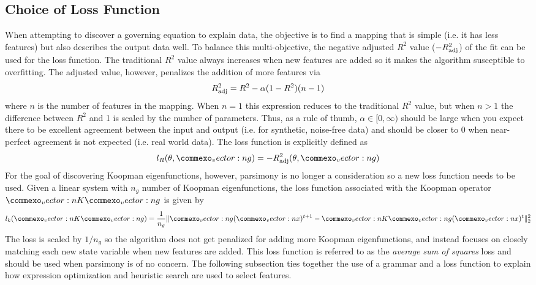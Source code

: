 \documentclass{article}
\renewcommand{\vec}[1]{\vect{#1}}
\newcommand{\mat}[1]{\vect{#1}}
\begin{document}
\subsection{Choice of Loss Function}
\label{lossfunction}
When attempting to discover a governing equation to explain data, the objective is to find a mapping that is simple (i.e. it has less features) but also describes the output data well. To balance this multi-objective, the negative adjusted $R^2$ value ($-R_{\rm adj}^2$) of the fit can be used for the loss function. The traditional $R^2$ value always increases when new features are added so it makes the algorithm susceptible to overfitting. The adjusted value, however, penalizes the addition of more features via
\begin{equation} 
R_{\rm adj}^2 = R^2 - \alpha (1-  R^2)(n-1)
\end{equation}
where $n$ is the number of features in the mapping. When $n=1$ this expression reduces to the traditional $R^2$ value, but when $n>1$ the difference between $R^2$ and 1 is scaled by the number of parameters. Thus, as a rule of thumb, $\alpha \in [0, \infty)$ should be large when you expect there to be excellent agreement between the input and output (i.e. for synthetic, noise-free data) and should be closer to 0 when near-perfect agreement is not expected (i.e. real world data). The loss function is explicitly defined as 
\begin{equation}
    l_R(\theta, \vec{g}) = - R_{\rm adj}^2(\theta, \vec{g})
\end{equation}
For the goal of discovering Koopman eigenfunctions, however, parsimony is no longer a consideration so a new loss function needs to be used. Given a linear system with $n_g$ number of Koopman eigenfunctions, the loss function associated with the Koopman operator $\mat{K} \vec{g}$ is given by
\begin{equation} l_k(\mat{K} \vec{g}) = \frac{1}{n_g}\lVert \vec{g}(\vec{x})^{t+1} - \mat{K} \vec{g}(\vec{x})^{t}\rVert _2^2 \end{equation}
The loss is scaled by $1/n_g$ so the algorithm does not get penalized for adding more Koopman eigenfunctions, and instead focuses on closely matching each new state variable when new features are added. This loss function is referred to as the \emph{average sum of squares} loss and should be used when parsimony is of no concern. The following subsection ties together the use of a grammar and a loss function to explain how expression optimization and heuristic search are used to select features.
\end{document}
